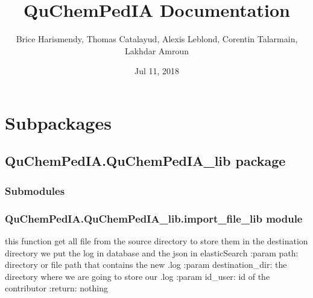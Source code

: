 \documentclass[letterpaper,10pt,english]{sphinxmanual}
\title{QuChemPedIA Documentation}
\date{Jul 11, 2018}
\author{Brice Harismendy, Thomas Catalayud, Alexis Leblond, Corentin Talarmain, Lakhdar Amroun}
\begin{document}
\maketitle
\sphinxtableofcontents
{}\label{\detokenize{QuChemPedIA::doc}}



\chapter{Subpackages}
\label{\detokenize{QuChemPedIA:subpackages}}

\section{QuChemPedIA.QuChemPedIA\_lib package}
\label{\detokenize{QuChemPedIA.QuChemPedIA_lib:quchempedia-quchempedia-lib-package}}\label{\detokenize{QuChemPedIA.QuChemPedIA_lib::doc}}

\subsection{Submodules}
\label{\detokenize{QuChemPedIA.QuChemPedIA_lib:submodules}}

\subsection{QuChemPedIA.QuChemPedIA\_lib.import\_file\_lib module}
\label{\detokenize{QuChemPedIA.QuChemPedIA_lib:module-QuChemPedIA.QuChemPedIA_lib.import_file_lib}}\label{\detokenize{QuChemPedIA.QuChemPedIA_lib:quchempedia-quchempedia-lib-import-file-lib-module}}

\begin{fulllineitems}
\label{\detokenize{QuChemPedIA.QuChemPedIA_lib:QuChemPedIA.QuChemPedIA_lib.import_file_lib.clean_file}}
\end{fulllineitems}


\begin{fulllineitems}
\label{\detokenize{QuChemPedIA.QuChemPedIA_lib:QuChemPedIA.QuChemPedIA_lib.import_file_lib.create_query}}
this function get all file from the source directory to store them in the destination directory
we put the log in database and the json in elasticSearch
:param path: directory or file path that contains the new .log
:param destination\_dir: the directory where we are going to store our .log
:param id\_user: id of the contributor
:return: nothing

\end{fulllineitems}
\end{document}
